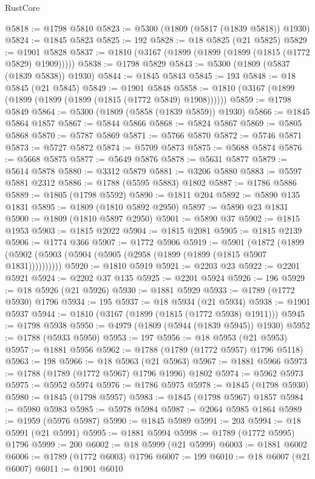 \begin{lexlean}{RustCore}
\begin{coremodule}
@5818 := @1798 @5810
@5823 := @5300 (@1809 (@5817 (@1839 @5818)) @1930)
@5824 := @1845 @5823
@5825 := 192
@5828 := @18 @5825 (@21 @5825)
@5829 := @1901 @5828
@5837 := @1810 (@3167 (@1899 (@1899 (@1899 (@1815 (@1772 @5829) @1909)))))
@5838 := @1798 @5829
@5843 := @5300 (@1809 (@5837 (@1839 @5838)) @1930)
@5844 := @1845 @5843
@5845 := 193
@5848 := @18 @5845 (@21 @5845)
@5849 := @1901 @5848
@5858 := @1810 (@3167 (@1899 (@1899 (@1899 (@1899 (@1815 (@1772 @5849) @1908))))))
@5859 := @1798 @5849
@5864 := @5300 (@1809 (@5858 (@1839 @5859)) @1930)
@5866 := @1845 @5864 @1857
@5867 := @5844 @5866
@5868 := @5824 @5867
@5869 := @5805 @5868
@5870 := @5787 @5869
@5871 := @5766 @5870
@5872 := @5746 @5871
@5873 := @5727 @5872
@5874 := @5709 @5873
@5875 := @5688 @5874
@5876 := @5668 @5875
@5877 := @5649 @5876
@5878 := @5631 @5877
@5879 := @5614 @5878
@5880 := @3312 @5879
@5881 := @3206 @5880
@5883 := @5597 @5881 @2312
@5886 := @1788 (@5595 @5883) @1802
@5887 := @1786 @5886
@5889 := @1805 (@1798 @5592)
@5890 := @1811 @204
@5892 := @5890 @135 @1831
@5895 := @1809 (@1810 @5892 @2950)
@5897 := @5890 @23 @1831
@5900 := @1809 (@1810 @5897 @2950)
@5901 := @5890 @37
@5902 := @1815 @1953
@5903 := @1815 @2022
@5904 := @1815 @2081
@5905 := @1815 @2139
@5906 := @1774 @366
@5907 := @1772 @5906
@5919 := @5901
    (@1872 (@1899 (@5902 (@5903 (@5904 (@5905 (@2958 (@1899 (@1899 (@1815 @5907 @1831))))))))))
@5920 := @1810 @5919
@5921 := @2203 @23
@5922 := @2201 @5921
@5924 := @2202 @37 @135
@5925 := @2201 @5924
@5926 := 196
@5929 := @18 @5926 (@21 @5926)
@5930 := @1881 @5929
@5933 := @1789 (@1772 @5930) @1796
@5934 := 195
@5937 := @18 @5934 (@21 @5934)
@5938 := @1901 @5937
@5944 := @1810 (@3167 (@1899 (@1815 (@1772 @5938) @1911)))
@5945 := @1798 @5938
@5950 := @4979 (@1809 (@5944 (@1839 @5945)) @1930)
@5952 := @1788 (@5933 @5950)
@5953 := 197
@5956 := @18 @5953 (@21 @5953)
@5957 := @1881 @5956
@5962 := @1788 (@1789 (@1772 @5957) @1796 @5118)
@5963 := 198
@5966 := @18 @5963 (@21 @5963)
@5967 := @1881 @5966
@5973 := @1788 (@1789 (@1772 @5967) @1796 @1996) @1802
@5974 := @5962 @5973
@5975 := @5952 @5974
@5976 := @1786 @5975
@5978 := @1845 (@1798 @5930)
@5980 := @1845 (@1798 @5957)
@5983 := @1845 (@1798 @5967) @1857
@5984 := @5980 @5983
@5985 := @5978 @5984
@5987 := @2064 @5985 @1864
@5989 := @1959 (@5976 @5987)
@5990 := @1845 @5989
@5991 := 203
@5994 := @18 @5991 (@21 @5991)
@5995 := @1881 @5994
@5998 := @1789 (@1772 @5995) @1796
@5999 := 200
@6002 := @18 @5999 (@21 @5999)
@6003 := @1881 @6002
@6006 := @1789 (@1772 @6003) @1796
@6007 := 199
@6010 := @18 @6007 (@21 @6007)
@6011 := @1901 @6010

\end{coremodule}
\end{lexlean}
